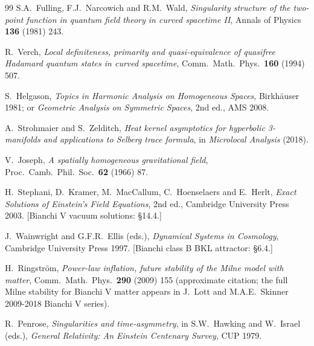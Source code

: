 \documentclass[11pt,a4paper]{article}
\theoremstyle{definition}
\begin{document}
\begin{thebibliography}{99}
S.A.\ Fulling, F.J.\ Narcowich and R.M.\ Wald, \emph{Singularity structure
of the two-point function in quantum field theory in curved spacetime II},
Annals of Physics \textbf{136} (1981) 243.

R.\ Verch, \emph{Local definiteness, primarity and quasi-equivalence of
quasifree Hadamard quantum states in curved spacetime}, Comm.\ Math.\ Phys.\
\textbf{160} (1994) 507.

S.\ Helgason, \emph{Topics in Harmonic Analysis on Homogeneous Spaces},
Birkh\"auser 1981; or \emph{Geometric Analysis on Symmetric Spaces},
2nd ed., AMS 2008.

A.\ Strohmaier and S.\ Zelditch, \emph{Heat kernel asymptotics for
hyperbolic 3-manifolds and applications to Selberg trace formula}, in
\emph{Microlocal Analysis} (2018).

V.\ Joseph, \emph{A spatially homogeneous gravitational field}, Proc.\
Camb.\ Phil.\ Soc.\ \textbf{62} (1966) 87.

H.\ Stephani, D.\ Kramer, M.\ MacCallum, C.\ Hoenselaers and E.\ Herlt,
\emph{Exact Solutions of Einstein's Field Equations}, 2nd ed., Cambridge
University Press 2003. [Bianchi V vacuum solutions: \S14.4.]

J.\ Wainwright and G.F.R.\ Ellis (eds.), \emph{Dynamical Systems in
Cosmology}, Cambridge University Press 1997. [Bianchi class B BKL
attractor: \S6.4.]

H.\ Ringstr\"om, \emph{Power-law inflation, future stability of the Milne
model with matter}, Comm.\ Math.\ Phys.\ \textbf{290} (2009) 155
(approximate citation; the full Milne stability for Bianchi V matter
appears in J.\ Lott and M.A.E.\ Skinner 2009-2018 Bianchi V series).

\bibitem{Penrose1979}
R.\ Penrose, \emph{Singularities and time-asymmetry}, in S.W.\ Hawking
and W.\ Israel (eds.), \emph{General Relativity: An Einstein Centenary
Survey}, CUP 1979.

\end{thebibliography}
\end{document}
